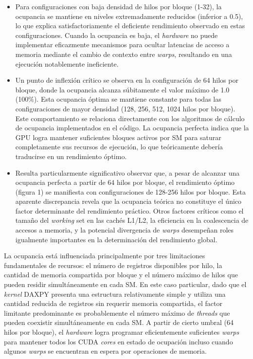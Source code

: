         \begin{itemize}
        
            \item Para configuraciones con baja densidad de hilos por bloque (1-32), la ocupancia se mantiene en niveles extremadamente reducidos (inferior a 0.5), lo que explica satisfactoriamente el deficiente rendimiento observado en estas configuraciones. Cuando la ocupancia es baja, el \textit{hardware} no puede implementar eficazmente mecanismos para ocultar latencias de acceso a memoria mediante el cambio de contexto entre \textit{warps}, resultando en una ejecución notablemente ineficiente.
            
            \item Un punto de inflexión crítico se observa en la configuración de 64 hilos por bloque, donde la ocupancia alcanza súbitamente el valor máximo de 1.0 (100\%). Esta ocupancia óptima se mantiene constante para todas las configuraciones de mayor densidad (128, 256, 512, 1024 hilos por bloque). Este comportamiento se relaciona directamente con los algoritmos de cálculo de ocupancia implementados en el código. La ocupancia perfecta indica que la GPU logra mantener suficientes bloques activos por SM para saturar completamente sus recursos de ejecución, lo que teóricamente debería traducirse en un rendimiento óptimo.
            
            \item Resulta particularmente significativo observar que, a pesar de alcanzar una ocupancia perfecta a partir de 64 hilos por bloque, el rendimiento óptimo (figura 1) se manifiesta con configuraciones de 128-256 hilos por bloque. Esta aparente discrepancia revela que la ocupancia teórica no constituye el único factor determinante del rendimiento práctico. Otros factores críticos como el tamaño del \textit{working} set en las cachés L1/L2, la eficiencia en la coalescencia de accesos a memoria, y la potencial divergencia de \textit{warps} desempeñan roles igualmente importantes en la determinación del rendimiento global.
        
        \end{itemize}
        
        La ocupancia está influenciada principalmente por tres limitaciones fundamentales de recursos: el número de registros disponibles por hilo, la cantidad de memoria compartida por bloque y el número máximo de hilos que pueden residir simultáneamente en cada SM. En este caso particular, dado que el \textit{kernel} DAXPY presenta una estructura relativamente simple y utiliza una cantidad reducida de registros sin requerir memoria compartida, el factor limitante predominante es probablemente el número máximo de \textit{threads} que pueden coexistir simultáneamente en cada SM. A partir de cierto umbral (64 hilos por bloque), el \textit{hardware} logra programar eficientemente suficientes \textit{warps} para mantener todos los CUDA \textit{cores} en estado de ocupación incluso cuando algunos \textit{warps} se encuentran en espera por operaciones de memoria.

